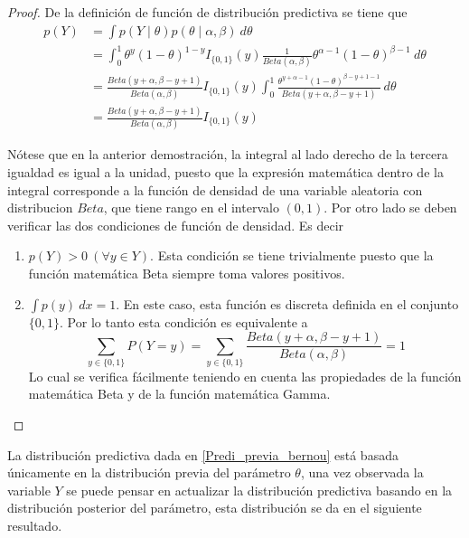     \begin{proof}
    De la definici\'on de funci\'on de distribuci\'on predictiva se tiene que
    \begin{align*}
    p(Y)&=\int p(Y \mid \theta)p(\theta \mid \alpha,\beta)\ d\theta\\
    &=\int_0^1 \theta^y(1-\theta)^{1-y}I_{\{0,1\}}(y)\frac{1}{Beta(\alpha,\beta)}\theta^{\alpha-1}(1-\theta)^{\beta-1}\ d\theta\\
    &=\frac{Beta(y+\alpha,\beta-y+1)}{Beta(\alpha,\beta)}I_{\{0,1\}}(y)
    \int_0^1\frac{\theta^{y+\alpha-1}(1-\theta)^{\beta-y+1-1}}{Beta(y+\alpha,\beta-y+1)}\ d\theta\\
    &=\frac{Beta(y+\alpha,\beta-y+1)}{Beta(\alpha,\beta)}I_{\{0,1\}}(y)
    \end{align*}
    
    N\'otese que en la anterior demostraci\'on, la integral al lado derecho de la tercera igualdad es igual a la unidad, puesto que la expresi\'on matem\'atica dentro de la integral corresponde a la funci\'on de densidad de una variable aleatoria con distribucion $Beta$, que tiene rango en el intervalo $(0,1)$. Por otro lado se deben verificar las dos condiciones de funci\'on de densidad. Es decir
    \begin{enumerate}
    \item $p(Y)>0 ~(\forall y\in Y)$. Esta condici\'on se tiene trivialmente puesto que la funci\'on matem\'atica Beta siempre toma valores positivos.
    \item $\int p(y)\ dx=1$. En este caso, esta funci\'on es discreta definida en el conjunto $\{0,1\}$. Por lo tanto esta condici\'on es equivalente a
    \begin{equation*}
    \sum_{y\in{\{0,1\}}}P(Y=y)=\sum_{y\in{\{0,1\}}}\frac{Beta(y+\alpha,\beta-y+1)}{Beta(\alpha,\beta)}=1
    \end{equation*}
    Lo cual se verifica f\'acilmente teniendo en cuenta las propiedades de la funci\'on matem\'atica Beta y de la funci\'on matem\'atica Gamma.
    \end{enumerate}
    \end{proof}
    
    La distribuci\'on predictiva dada en \ref{Predi_previa_bernou} est\'a basada \'unicamente en la distribuci\'on previa del par\'ametro $\theta$, una vez observada la variable $Y$ se puede pensar en actualizar la distribuci\'on predictiva basando en la distribuci\'on posterior del par\'ametro, esta distribuci\'on se da en el siguiente resultado.
    

